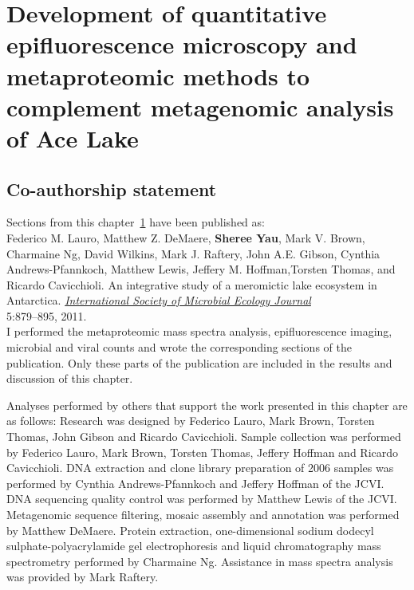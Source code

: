 \chapter[Development of methods to complement metagenomic analysis of Ace Lake]{Development of quantitative epifluorescence microscopy and metaproteomic methods to complement metagenomic analysis of Ace Lake}
\label{ch:ace}
\acresetall

\section*{Co-authorship statement}

Sections from this chapter~\ref{ch:ace} have been published as:\\

Federico M. Lauro, Matthew Z. DeMaere, \textbf{Sheree Yau}, Mark V. Brown, Charmaine Ng,
David Wilkins, Mark J. Raftery, John A.E. Gibson, Cynthia Andrews-Pfannkoch, Matthew Lewis,
Jeffery M. Hoffman,Torsten Thomas, and Ricardo Cavicchioli. 
An integrative study of a meromictic lake ecosystem in Antarctica.
\emph{\underline{International Society of Microbial Ecology Journal}}\\
5:879--895, 2011.\\

I performed the metaproteomic mass spectra analysis, epifluorescence imaging,
microbial and viral counts and wrote the corresponding sections of the publication.
Only these parts of the publication are included in the results and discussion of this chapter.

Analyses performed by others that support the work presented in this chapter are as follows:
Research was designed by Federico Lauro, Mark Brown, Torsten Thomas, John Gibson and Ricardo Cavicchioli.
Sample collection was performed by Federico Lauro, Mark Brown, Torsten Thomas, Jeffery Hoffman and Ricardo Cavicchioli.
DNA extraction and clone library preparation of 2006 samples was performed by Cynthia Andrews-Pfannkoch and Jeffery Hoffman of the \ac{JCVI}.
DNA sequencing quality control was performed by Matthew Lewis of the \ac{JCVI}.
Metagenomic sequence filtering, mosaic assembly and annotation was performed by Matthew DeMaere.
Protein extraction, one-dimensional sodium dodecyl sulphate-polyacrylamide gel electrophoresis and liquid chromatography mass spectrometry performed by Charmaine Ng.
Assistance in mass spectra analysis was provided by Mark Raftery.
\newpage

